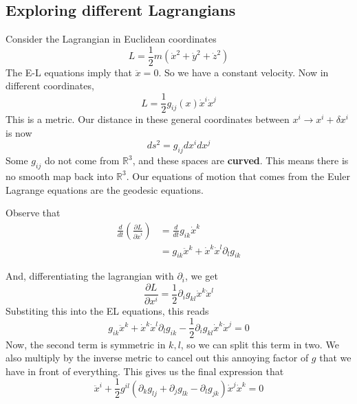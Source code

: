\subsection{Exploring different Lagrangians} 
Consider the Lagrangian in Euclidean coordinates 
\[ L = \frac{1}{2} m ( \dot{x}^2 + \dot{y}^2 + \dot{z}^2 ) 
\] 
The E-L equations imply that $\ddot {x} = 0 $. So we have a constant velocity. Now in different coordinates, 
\[ L = \frac{ 1}{2} g_{ ij } (x) \dot{x}^i \dot{x}^j \] 
This is a metric. Our distance in these general coordinates between $x^i \rightarrow x^i + \delta x^i $ is now 
\[ 
ds^2 = g_{ij} dx^i dx^j \] 
Some $g_{ij} $ do not come from $\mathbb{R}^3 $, and these spaces are \textbf{curved}. This means there is no smooth map back into $\mathbb{R}^3$. Our equations of motion that comes from the Euler Lagrange equations are the geodesic equations.  

Observe that 
\begin{align*} 
\frac{d}{dt} \left( \frac{ \partial L}{\partial \dot{x}^i } \right) &= \frac{d}{dt} g_{ ik}\dot{x}^k \\
&= g_{ik} \ddot{x}^k + \dot{x}^k \dot{x}^l \partial_l g_{ ik}\end{align*} 

And, differentiating the lagrangian with $\partial_i$, we get
\[ 
\frac{ \partial L}{ \partial x^i} = \frac{ 1}{2} \partial_i g_{kl} \dot{x}^k \dot{x}^l \]
Substiting this into the EL equations, this reads 
\[ 
g_{ik} \ddot{x}^k + \dot{x}^k \dot{x}^l \partial_l g_{ ik}  - \frac{1}{2} \partial_i g_{kl} \dot{x}^k \dot{x}^j  =0 
\]  
Now, the second term is symmetric in $k, l$, so we can split this term in two. We also multiply by the inverse metric to cancel out this annoying factor of $g$ that we have in front of everything. This gives us the final expression that 
\[ 
\ddot{x}^i + \frac{1}{2} g^{il} \left( \partial_k g_{lj} + \partial_j g_{lk}  - \partial_l g_{jk} \right) \dot{x}^j \dot{x}^k = 0
\] 

